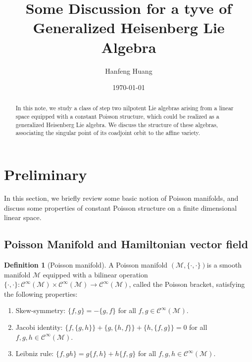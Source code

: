 \documentclass[11vt,a4vaver]{article}
\title{Some Discussion for a tyve of Generalized Heisenberg Lie Algebra}
\author{Hanfeng Huang}
\date{\today}
\theoremstyle{definition}
\newtheorem{definition}[theorem]{Definition}
\begin{document}
\maketitle

\begin{abstract}
In this note, we study a class of step two nilpotent Lie algebras arising
from a linear space equipped with a constant Poisson structure, which could 
be realized as a generalized Heisenberg Lie algebra. We discuss the structure of these algebras, 
associating the singular point of its coadjoint orbit to the affine variety.

\end{abstract}

\tableofcontents
\vspace{1em}

\section{Preliminary}
\label{sec:intro}
In this section, we briefly review some basic notion of Poisson manifolds, and discuss some 
properties of constant Poisson structure on a finite dimensional linear space.

\subsection{Poisson Manifold and Hamiltonian vector field}

\begin{definition}[Poisson       manifold]
    A Poisson manifold $(\mathcal{M}, \{\cdot,\cdot\})$is a smooth manifold $\mathcal{M} $ equipped with a 
    bilinear operation $\{\cdot,\cdot\}: \mathcal{C} ^\infty(\mathcal{M} ) \times \mathcal{C} ^\infty(\mathcal{M} ) 
    \to \mathcal{C} ^\infty(\mathcal{M} )$, called the Poisson bracket, satisfying the following properties:
    \begin{enumerate}
        \item Skew-symmetry: $\{f,g\} = -\{g,f\}$ for all $f,g \in \mathcal{C} ^\infty(\mathcal{M} )$.
        \item Jacobi identity: $\{f,\{g,h\}\} + \{g,\{h,f\}\} + \{h,\{f,g\}\} = 0$ for all $f,g,h \in \mathcal{C} ^\infty(\mathcal{M} )$.
        \item Leibniz rule: $\{f,gh\} = g\{f,h\} + h\{f,g\}$ for all $f,g,h \in \mathcal{C} ^\infty(\mathcal{M} )$.
    \end{enumerate}
\end{definition}
\end{document}
